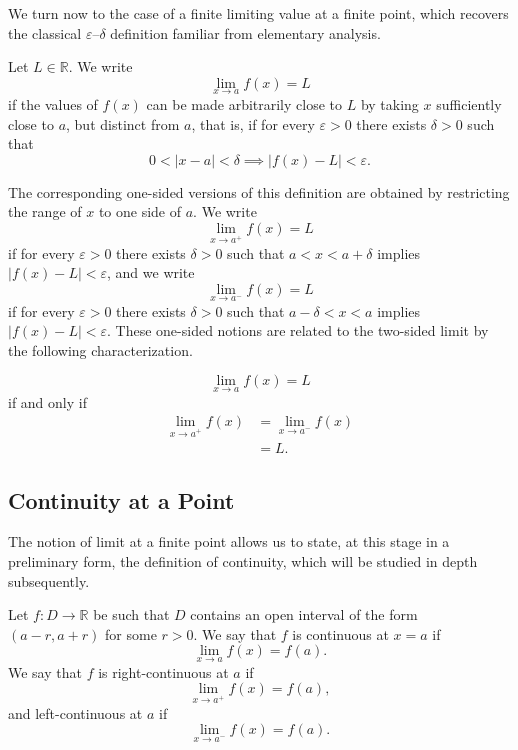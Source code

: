 We turn now to the case of a finite limiting value at a finite point, which recovers the classical $\varepsilon$--$\delta$ definition familiar from elementary analysis.

\begin{definition}
Let $L \in \mathbb{R}$. We write \[
\lim_{x \to a} f(x) = L
\] if the values of $f(x)$ can be made arbitrarily close to $L$ by taking $x$ sufficiently close to $a$, but distinct from $a$, that is, if for every $\varepsilon > 0$ there exists $\delta > 0$ such that
\[
0 < |x - a| < \delta \implies |f(x) - L| < \varepsilon.
\]

\end{definition}

The corresponding one-sided versions of this definition are obtained by restricting the range of $x$ to one side of $a$. We write \[
\lim_{x \to a^+} f(x) = L
\] if for every $\varepsilon > 0$ there exists $\delta > 0$ such that $a < x < a + \delta$ implies $|f(x) - L| < \varepsilon$, and we write \[
\lim_{x \to a^-} f(x) = L
\] if for every $\varepsilon > 0$ there exists $\delta > 0$ such that $a - \delta < x < a$ implies $|f(x) - L| < \varepsilon$. These one-sided notions are related to the two-sided limit by the following characterization.

\begin{remark}

\[
\lim_{x \to a} f(x) = L
\]
if and only if
\[
\begin{aligned}
\lim_{x \to a^+} f(x) &= \lim_{x \to a^-} f(x) \\
&= L.
\end{aligned}
\]

\end{remark}

\subsection{Continuity at a Point}

The notion of limit at a finite point allows us to state, at this stage in a preliminary form, the definition of continuity, which will be studied in depth subsequently.

\begin{definition}[Continuity]
Let $f : D \to \mathbb{R}$ be such that $D$ contains an open interval of the form $(a-r, a+r)$ for some $r > 0$. We say that $f$ is continuous at $x = a$ if
\[
\lim_{x \to a} f(x) = f(a).
\]
We say that $f$ is right-continuous at $a$ if \[
\lim_{x \to a^+} f(x) = f(a),
\] and left-continuous at $a$ if
\[
\lim_{x \to a^-} f(x) = f(a).
\]

\end{definition}

